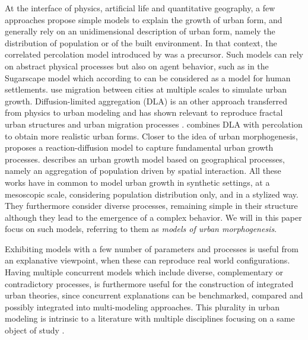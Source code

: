 \documentclass[10pt,letterpaper]{article}
\begin{document}
At the interface of physics, artificial life and quantitative geography, a few approaches propose simple models to explain the growth of urban form, and generally rely on an unidimensional description of urban form, namely the distribution of population or of the built environment. In that context, the correlated percolation model introduced by \cite{makse1998modeling} was a precursor. Such models can rely on abstract physical processes but also on agent behavior, such as in the Sugarscape model which according to \cite{batty2007cities} can be considered as a model for human settlements. \cite{murcio2015urban} use migration between cities at multiple scales to simulate urban growth. Diffusion-limited aggregation (DLA) is an other approach transferred from physics to urban modeling \cite{batty1989urban} and has shown relevant to reproduce fractal urban structures and urban migration processes \cite{murcio2009colored}. \cite{murcio2013second} combines DLA with percolation to obtain more realistic urban forms. Closer to the idea of urban morphogenesis, \cite{10.1371/journal.pone.0203516} proposes a reaction-diffusion model to capture fundamental urban growth processes. \cite{li2019singularity} describes an urban growth model based on geographical processes, namely an aggregation of population driven by spatial interaction. All these works have in common to model urban growth in synthetic settings, at a mesoscopic scale, considering population distribution only, and in a stylized way. They furthermore consider diverse processes, remaining simple in their structure although they lead to the emergence of a complex behavior. We will in this paper focus on such models, referring to them as \emph{models of urban morphogenesis}.


Exhibiting models with a few number of parameters and processes is useful from an explanative viewpoint, when these can reproduce real world configurations. Having multiple concurrent models which include diverse, complementary or contradictory processes, is furthermore useful for the construction of integrated urban theories, since concurrent explanations can be benchmarked, compared and possibly integrated into multi-modeling approaches. This plurality in urban modeling is intrinsic to a literature with multiple disciplines focusing on a same object of study \cite{pumain2020conclusion}.


\end{document}
